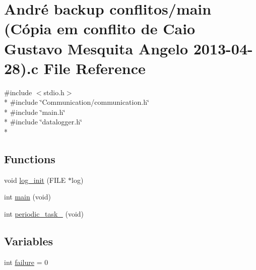 \hypertarget{main_01_07C_xC3_xB3pia_01em_01conflito_01de_01Caio_01Gustavo_01Mesquita_01Angelo_012013-04-28_08_8c}{\section{André backup conflitos/main (Cópia em conflito de Caio Gustavo Mesquita Angelo 2013-\/04-\/28).c File Reference}
\label{main_01_07C_xC3_xB3pia_01em_01conflito_01de_01Caio_01Gustavo_01Mesquita_01Angelo_012013-04-28_08_8c}
}
{\ttfamily \#include $<$stdio.\-h$>$}\\*
{\ttfamily \#include \char`\"{}Communication/communication.\-h\char`\"{}}\\*
{\ttfamily \#include \char`\"{}main.\-h\char`\"{}}\\*
{\ttfamily \#include \char`\"{}datalogger.\-h\char`\"{}}\\*
\subsection*{Functions}
\begin{DoxyCompactItemize}
\item 
void \hyperlink{main_01_07C_xC3_xB3pia_01em_01conflito_01de_01Caio_01Gustavo_01Mesquita_01Angelo_012013-04-28_08_8c_aa570d24f638774bf52f70f1d9d9d45f8}{log\-\_\-init} (F\-I\-L\-E $\ast$log)
\item 
int \hyperlink{main_01_07C_xC3_xB3pia_01em_01conflito_01de_01Caio_01Gustavo_01Mesquita_01Angelo_012013-04-28_08_8c_a840291bc02cba5474a4cb46a9b9566fe}{main} (void)
\item 
int \hyperlink{main_01_07C_xC3_xB3pia_01em_01conflito_01de_01Caio_01Gustavo_01Mesquita_01Angelo_012013-04-28_08_8c_a26855b7739897854265d51aa61329390}{periodic\-\_\-task\-\_} (void)
\end{DoxyCompactItemize}
\subsection*{Variables}
\begin{DoxyCompactItemize}
\item 
int \hyperlink{main_01_07C_xC3_xB3pia_01em_01conflito_01de_01Caio_01Gustavo_01Mesquita_01Angelo_012013-04-28_08_8c_a4f35e5ea2395561d0bd3b2f45612dc2c}{failure} = 0
\end{DoxyCompactItemize}


